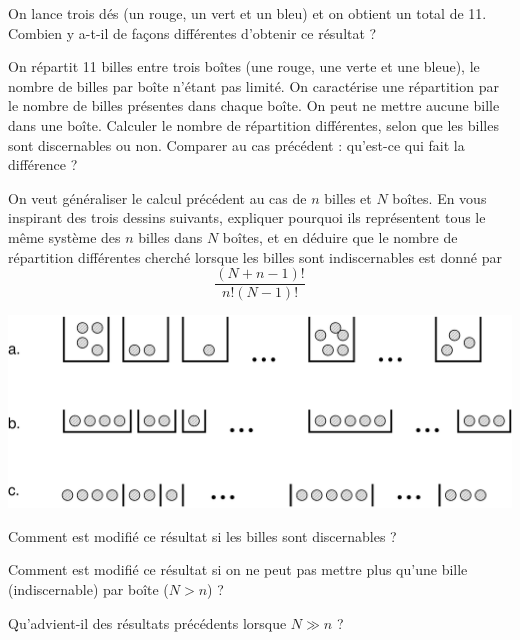 \question
On lance trois dés (un rouge, un vert et un bleu) et on obtient un total de 11. Combien y a-t-il de façons différentes d'obtenir ce résultat ? 

\question
On répartit 11 billes entre trois boîtes (une rouge, une verte et une bleue), le nombre de billes par boîte n'étant pas limité. On caractérise une répartition par le nombre de billes présentes dans chaque boîte. On peut ne mettre aucune bille dans une boîte. Calculer le nombre de répartition différentes, selon que les billes sont discernables ou non. Comparer au cas précédent : qu'est-ce qui fait la différence ?

\question
On veut généraliser le calcul précédent au cas de $n$ billes et $N$ boîtes. En vous inspirant des trois dessins suivants, expliquer pourquoi ils représentent  tous le même système des $n$ billes dans $N$ boîtes, et en déduire que le nombre de répartition différentes cherché lorsque les billes sont indiscernables est donné par
$$
\frac{(N+n-1)!}{n! (N-1)!}
$$

\centerline{\includegraphics[height=.3\textwidth]{../Fig/Billes}}

\question
Comment est modifié ce résultat si les billes sont discernables ?

\question
Comment est modifié ce résultat si on ne peut pas mettre plus qu'une bille (indiscernable) par boîte ($N>n$) ?

\question
Qu'advient-il des résultats précédents lorsque $N\gg n$ ?
